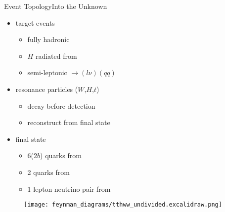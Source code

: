 \documentclass[9pt, aspectratio=169]{beamer}
\begin{document}
\begin{frame}{Event Topology}{Into the Unknown}
	\begin{minipage}{.58\textwidth}
		\begin{itemize}
			\item target \ttHWW events
			\begin{itemize}
				\item fully hadronic \ttbar
				\item $H$ radiated from \ttbar
				\item semi-leptonic \HWW$\rightarrow (l\nu)(qq)$
        	\end{itemize}
			\item resonance particles ($W$,$H$,$t$)
			\begin{itemize}
				\item decay before detection
				\item reconstruct from final state
			\end{itemize} 
			\item final state
			\begin{itemize}
				\item 6(2$b$) quarks from \ttbar
				\item 2 quarks from \HWW
				\item 1 lepton-neutrino pair from \HWW 
			\end{itemize}
		\end{itemize}
	\end{minipage}
	\begin{minipage}{.4\textwidth}
		\begin{figure}
			\centering
			\texttt{[image: feynman\_diagrams/tthww\_undivided.excalidraw.png]}
		\end{figure}
	\end{minipage}
\end{frame}
\end{document}
